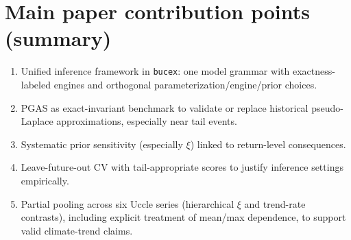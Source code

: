 \documentclass[11pt]{article}
\begin{document}
\section{Main paper contribution points (summary)}
\begin{enumerate}
\item Unified inference framework in \texttt{bucex}: one model grammar with exactness-labeled engines and orthogonal parameterization/engine/prior choices.
\item PGAS as exact-invariant benchmark to validate or replace historical pseudo-Laplace approximations, especially near tail events.
\item Systematic prior sensitivity (especially $\xi$) linked to return-level consequences.
\item Leave-future-out CV with tail-appropriate scores to justify inference settings empirically.
\item Partial pooling across six Uccle series (hierarchical $\xi$ and trend-rate contrasts), including explicit treatment of mean/max dependence, to support valid climate-trend claims.
\end{enumerate}
\end{document}
